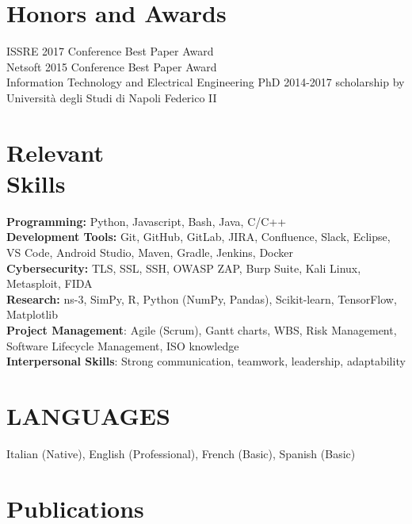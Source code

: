 \documentclass[margin,line]{resume}
\begin{document}
\begin{resume}
\section{\mysidestyle Honors and Awards}
ISSRE 2017 Conference Best Paper Award
\vspace{1mm}\\%
Netsoft 2015 Conference Best Paper Award
\vspace{1mm}\\%
Information Technology and Electrical Engineering PhD 2014-2017 scholarship by Universit\`a degli Studi di Napoli Federico II

\filbreak
\section{\mysidestyle Relevant\\Skills} 
\textbf{Programming:} Python, Javascript, Bash, Java, C/C++\vspace{2mm}\\
\textbf{Development Tools:} Git, GitHub, GitLab, JIRA, Confluence, Slack, Eclipse, VS Code, Android Studio, Maven, Gradle, Jenkins, Docker \vspace{2mm}\\
\textbf{Cybersecurity:} TLS, SSL, SSH, OWASP ZAP, Burp Suite, Kali Linux, Metasploit, FIDA  \vspace{2mm}\\
\textbf{Research:} ns-3, SimPy, R, Python (NumPy, Pandas), Scikit-learn, TensorFlow, Matplotlib  \vspace{2mm}\\
\textbf{Project Management}: Agile (Scrum), Gantt charts, WBS, Risk Management, Software Lifecycle Management, ISO knowledge \vspace{2mm}\\
\textbf{Interpersonal Skills}: Strong communication, teamwork, leadership, adaptability \vspace{2mm}\\

\filbreak
\section{\mysidestyle LANGUAGES} 
Italian (Native), English (Professional), French (Basic), Spanish (Basic)

\filbreak
\section{\mysidestyle Publications}


\end{resume}
\end{document}

